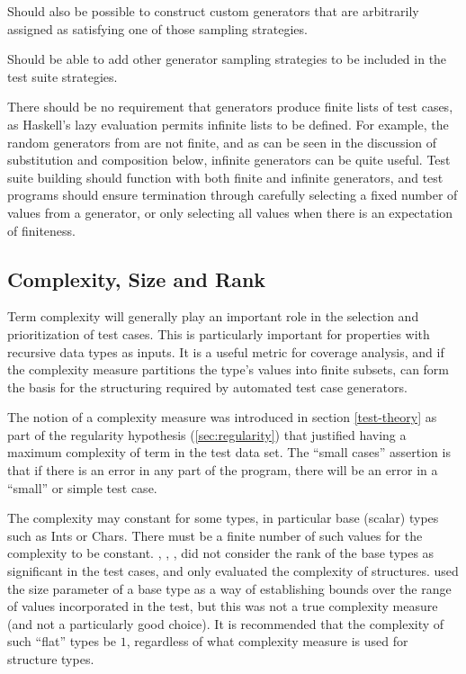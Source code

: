 Should also be possible to construct custom generators that 
are arbitrarily assigned as satisfying one of those sampling strategies.

Should be able to add other generator sampling strategies 
to be included in the test suite strategies.

There should be no requirement that generators produce finite lists of test cases,
as Haskell's lazy evaluation permits infinite lists to be defined.
For example, the random generators from \QC are not finite,
and as can be seen in the discussion of substitution and composition below,
infinite generators can be quite useful.
Test suite building should function with both finite and infinite generators,
and test programs should ensure termination through 
carefully selecting a fixed number of values from a generator,
or only selecting all values when there is an expectation of finiteness.

\subsection{ Complexity, Size and Rank }\label{sub:reqrank}

Term complexity will generally play an important role
in the selection and prioritization of test cases.
This is particularly important for
properties with recursive data types as inputs.
It is a useful metric for coverage analysis,
and if the complexity measure partitions the type's values into finite subsets,
can form the basis for the structuring required by automated test case generators.

The notion of a complexity measure was introduced in section \ref{test-theory}
as part of the regularity hypothesis  (\ref{sec:regularity})
that justified having a maximum complexity of term in the test data set.
The ``small cases'' assertion is that if there is an error in any part of the program,
there will be an error in a ``small'' or simple test case.

The complexity may constant for some types, 
in particular base (scalar) types such as Ints or Chars.
There must be a finite number of such values 
for the complexity to be constant.
\QC, \EC, \GAST, \FEAT did not consider the rank of the base types as significant in the test cases,
and only evaluated the complexity of structures.
\SC used the size parameter of a base type as a way of establishing
bounds over the range of values incorporated in the test,
but this was not a true complexity measure (and not a particularly good choice).
It is recommended that the complexity of such ``flat'' types be $1$,
regardless of what complexity measure is used for structure types.

